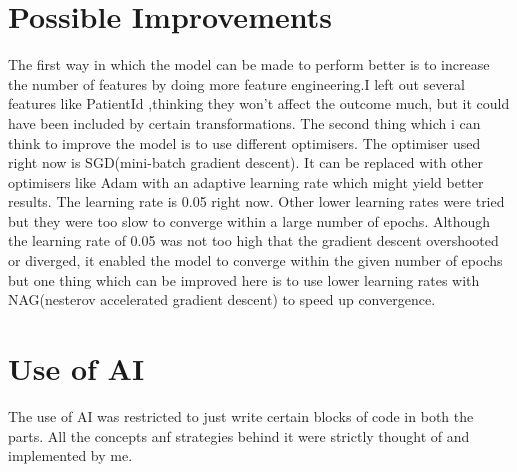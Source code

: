 \documentclass[12pt]{article}
\begin{document}
\section{Possible Improvements }
The first way in which the model can be made to perform better is to increase the number of features by doing more feature engineering.I left out several features like PatientId ,thinking they won't affect the outcome much, but it could have been included by certain transformations.
The second thing which i can think to improve the model is to use different optimisers. The optimiser used right now is SGD(mini-batch gradient descent). It can be replaced with other optimisers like Adam with an adaptive learning rate which might yield better results.
The learning rate is 0.05 right now. Other lower learning rates were tried but they were too slow to converge within a large number of epochs. Although the learning rate of 0.05 was not too high that the gradient descent overshooted or diverged, it enabled the model to converge within the given number of epochs but one thing which can be improved here is to use lower learning rates with NAG(nesterov accelerated gradient descent) to speed up convergence.
\section{Use of AI}
The use of AI was restricted to just write certain blocks of code in both the parts. All the concepts anf strategies behind it were strictly thought of and implemented by me.
\end{document}
